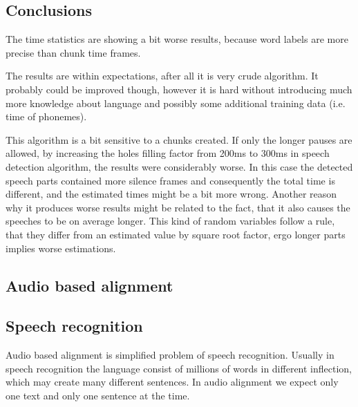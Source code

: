 \documentclass[12pt,a4paper,english]{article}
\begin{document}
\newpage
\subsection{Conclusions}

The time statistics are showing a bit worse results, because word labels are more precise than chunk time frames. \newline

The results are within expectations, after all it is very crude algorithm. It probably could be improved though, however it is hard without introducing much more knowledge about language and possibly some additional training data (i.e. time of phonemes). \newline

This algorithm is a bit sensitive to a chunks created. If only the longer pauses are allowed, by increasing the holes filling factor from 200ms to 300ms in  speech detection algorithm, the results were considerably worse. \newline
In this case the detected speech parts contained more silence frames and consequently the total time is different, and the estimated times might be a bit more wrong. Another reason why it produces worse results might be related to the fact, that it also causes the speeches to be on average longer. This kind of random variables follow a rule, that they differ from an estimated value by square root factor, ergo longer parts implies worse estimations.

\newpage
\begin{center}
    \section{Audio based alignment}
\end {center}
\subsection{Speech recognition}

Audio based alignment is simplified problem of speech recognition. Usually in speech recognition the language consist of millions of words in different inflection, which may create many different sentences. In audio alignment we expect only one text and only one sentence at the time. \newline
\end{document}
